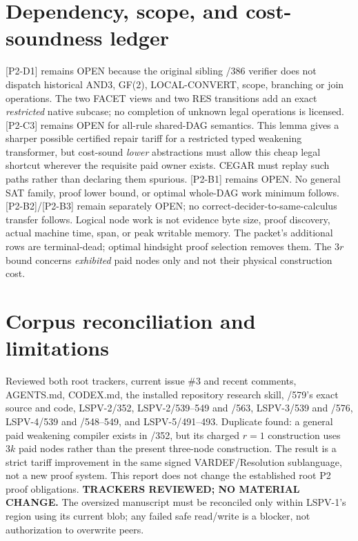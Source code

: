 \documentclass[11pt]{article}
\begin{document}
\section*{Dependency, scope, and cost-soundness ledger}
[P2-D1] remains OPEN because the original sibling /386 verifier does not dispatch historical AND3, GF(2), LOCAL-CONVERT, scope, branching or join operations. The two FACET views and two RES transitions add an exact \emph{restricted} native subcase; no completion of unknown legal operations is licensed.
[P2-C3] remains OPEN for all-rule shared-DAG semantics. This lemma gives a sharper possible certified repair tariff for a restricted typed weakening transformer, but cost-sound \emph{lower} abstractions must allow this cheap legal shortcut wherever the requisite paid owner exists. CEGAR must replay such paths rather than declaring them spurious.
[P2-B1] remains OPEN. No general SAT family, proof lower bound, or optimal whole-DAG work minimum follows.
[P2-B2]/[P2-B3] remain separately OPEN; no correct-decider-to-same-calculus transfer follows.
Logical node work is not evidence byte size, proof discovery, actual machine time, span, or peak writable memory. The packet's additional rows are terminal-dead; optimal hindsight proof selection removes them. The $3r$ bound concerns \emph{exhibited} paid nodes only and not their physical construction cost.

\section*{Corpus reconciliation and limitations}
Reviewed both root trackers, current issue \#3 and recent comments, AGENTS.md, CODEX.md, the installed repository research skill, /579's exact source and code, LSPV-2/352, LSPV-2/539--549 and /563, LSPV-3/539 and /576, LSPV-4/539 and /548--549, and LSPV-5/491--493. Duplicate found: a general paid weakening compiler exists in /352, but its charged $r=1$ construction uses $3k$ paid nodes rather than the present three-node construction. The result is a strict tariff improvement in the same signed VARDEF/Resolution sublanguage, not a new proof system. This report does not change the established root P2 proof obligations. \textbf{TRACKERS REVIEWED; NO MATERIAL CHANGE.} The oversized manuscript must be reconciled only within LSPV-1's region using its current blob; any failed safe read/write is a blocker, not authorization to overwrite peers.
\end{document}
